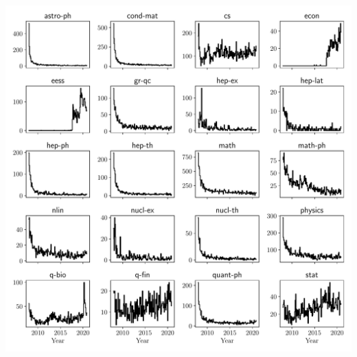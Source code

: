 \documentclass{nature}
\makeatletter
\renewenvironment*{figure}{\@float{figure}}{\end@float}
\newcommand{\arxiv}{arXiv}
\makeatother
\begin{document}
\begin{figure}
	\includegraphics[width=\textwidth]{pre-prints-with-entirely-new-authors}
	\caption{The number of pre-prints appearing per field where all authors have never appeared in the literature for that field before. A sharp increase remains present for quantitative biology (q-bio), representing an influx of pre-prints entirely written by authors who had never posted to \arxiv/q-bio before.}
		\label{fig:pre-prints-with-entirely-new-authors}
\end{figure}
\end{document}
